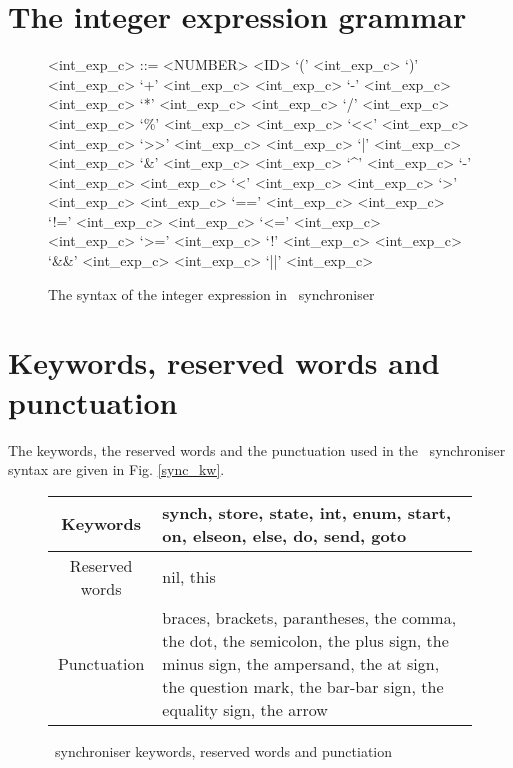     \section{The integer expression grammar\label{int_exp_gr}}
\setlength{\grammarindent}{8em} %
\begin{figure}[h!]
\scriptsize
\begin{grammar}
<int\_exp\_c> ::= <NUMBER>
                \alt <ID>
                \alt `(' <int\_exp\_c> `)'
                \alt <int\_exp\_c> `+' <int\_exp\_c>
                \alt <int\_exp\_c> `-' <int\_exp\_c>
                \alt <int\_exp\_c> `*' <int\_exp\_c>
                \alt <int\_exp\_c> `/' <int\_exp\_c>
                \alt <int\_exp\_c> `\%' <int\_exp\_c>
                \alt <int\_exp\_c> `<<' <int\_exp\_c>
                \alt <int\_exp\_c> `>>' <int\_exp\_c>
                \alt <int\_exp\_c> `|' <int\_exp\_c>
                \alt <int\_exp\_c> `&' <int\_exp\_c>
                \alt <int\_exp\_c> `^' <int\_exp\_c>
                \alt `-' <int\_exp\_c> %
                \alt <int\_exp\_c> `<' <int\_exp\_c>
                \alt <int\_exp\_c> `>' <int\_exp\_c>
                \alt <int\_exp\_c> `==' <int\_exp\_c>
                \alt <int\_exp\_c> `!=' <int\_exp\_c>
                \alt <int\_exp\_c> `<=' <int\_exp\_c>
                \alt <int\_exp\_c> `>=' <int\_exp\_c>
                \alt `!' <int\_exp\_c>
                \alt <int\_exp\_c> `&&' <int\_exp\_c>
                \alt <int\_exp\_c> `||' <int\_exp\_c>
\end{grammar}
\caption{The syntax of the integer expression in \ak\ synchroniser}
\end{figure}


    \section{Keywords, reserved words and punctuation\label{sync_kw}}
The keywords, the reserved words and the punctuation used in the \ak\ synchroniser syntax are given in Fig. \ref{sync_kw}.
\begin{figure}[h!]
\centering
\begin{tabular}{|c|p{}|}
\hline
Keywords & synch, store, state, int, enum, start, on, elseon, else, do, send, goto\\
\hline
Reserved words & nil, this\\
\hline
Punctuation & braces, brackets, parantheses, the comma, the dot, the semicolon, the plus sign, the minus sign, the ampersand, the at sign, the question mark, the bar-bar sign, the equality sign, the arrow\\
\hline
\end{tabular}
\caption{\ak\ synchroniser keywords, reserved words and punctiation}
\end{figure}
